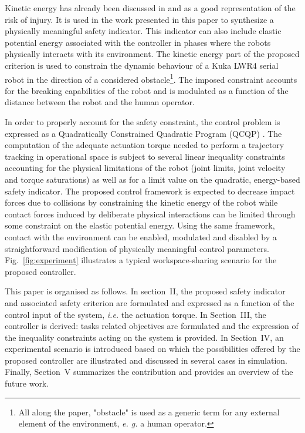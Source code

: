 \documentclass[a4paper, 10pt, conference]{ieeeconf}      %
\begin{document}
Kinetic energy has already been discussed in \cite{haddadin2008collision} and \cite{haddadin2012truly} as a good representation of the risk of injury. It is used in the work presented in this paper to synthesize a physically meaningful safety indicator. This indicator can also include elastic potential energy associated with the controller in phases where the robots physically interacts with its environment. The kinetic energy part of the proposed criterion is used to constrain the dynamic behaviour of a Kuka LWR4 serial robot in the direction of a considered obstacle\footnote{All along the paper, "obstacle" is used as a generic term for any external element of the environment, \textit{e. g.} a human operator.}. The imposed constraint accounts for the breaking capabilities of the robot and is modulated as a function of the distance between the robot and the human operator.

In order to properly account for the safety constraint, the control problem is expressed as a Quadratically Constrained Quadratic Program (QCQP) \cite{boyd2004}. The computation of the adequate actuation torque needed to perform a trajectory tracking in operational space is subject to several linear inequality constraints accounting for the physical limitations of the robot (joint limits, joint velocity and torque saturations) as well as for a limit value on the quadratic, energy-based safety indicator. The proposed control framework is expected to decrease impact forces due to collisions by constraining the kinetic energy of the robot while contact forces induced by deliberate physical interactions can be limited through some constraint on the elastic potential energy. Using the same framework, contact with the environment can be enabled, modulated and disabled by a straightforward modification of physically meaningful control parameters. Fig.~\ref{fig:experiment} illustrates a typical workspace-sharing scenario for the proposed controller.



This paper is organised as follows. In section~II, the proposed safety indicator and associated safety criterion are formulated and expressed as a function of the control input of the system, \textit{i.e.} the actuation torque. In Section~III, the controller is derived: tasks related objectives are formulated and the expression of the inequality constraints acting on the system is provided. In Section~IV, an experimental scenario is introduced based on which the possibilities offered by the proposed controller are illustrated and discussed in several cases in simulation. Finally, Section~V summarizes the contribution and provides an overview of the future work.
\end{document}
